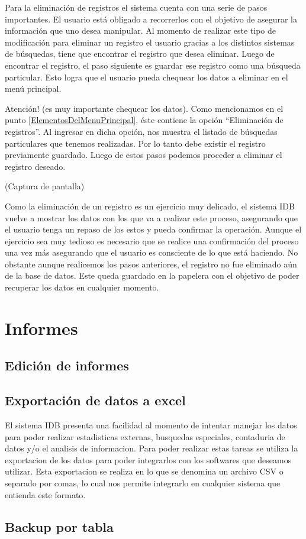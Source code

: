 \documentclass[a4paper,10pt]{article}
\begin{document}
Para la eliminación de registros el sistema cuenta con una serie de pasos importantes. El usuario está obligado a recorrerlos con el objetivo de asegurar la información que uno desea manipular. Al momento de realizar este tipo de modificación para eliminar un registro el usuario gracias a los distintos sistemas de búsquedas, tiene que encontrar el registro que desea eliminar. Luego de encontrar el registro, el paso siguiente es guardar ese registro como una búsqueda particular. Esto logra que el usuario pueda chequear los datos a eliminar en el menú principal. 

Atención! (es muy importante chequear los datos). Como mencionamos en el punto \ref{ElementosDelMenuPrincipal}, éste contiene la opción “Eliminación de registros”. Al ingresar en dicha opción, nos muestra el listado de búsquedas particulares que tenemos realizadas. Por lo tanto debe existir el registro previamente guardado. Luego de estos pasos podemos proceder a eliminar el registro deseado.

(Captura de pantalla)

Como la eliminación de un registro es un ejercicio muy delicado, el sistema IDB vuelve a mostrar los datos con los que va a realizar este proceso, asegurando que el usuario tenga un repaso de los estos y pueda confirmar la operación. Aunque el ejercicio sea muy tedioso es necesario que se realice una confirmación del proceso una vez más asegurando que el usuario es consciente de lo que está haciendo. No obstante aunque realicemos los pasos anteriores, el registro no fue eliminado aún de la base de datos. Este queda guardado en la papelera con el objetivo de poder recuperar los datos en cualquier momento.

\section{Informes}
\subsection{Edición de informes}
\subsection{Exportación de datos a excel}
El sistema IDB presenta una facilidad al momento de intentar manejar los datos para poder realizar estadisticas externas, busquedas especiales, contaduria de datos y/o el analisis de informacion. Para poder realizar estas tareas se utiliza la exportacion de los datos para poder integrarlos con los softwares que deseamos utilizar. Esta exportacion se realiza en lo que se denomina un archivo CSV o separado por comas, lo cual nos permite integrarlo en cualquier sistema que entienda este formato.

\subsection{Backup por tabla}
\end{document}
